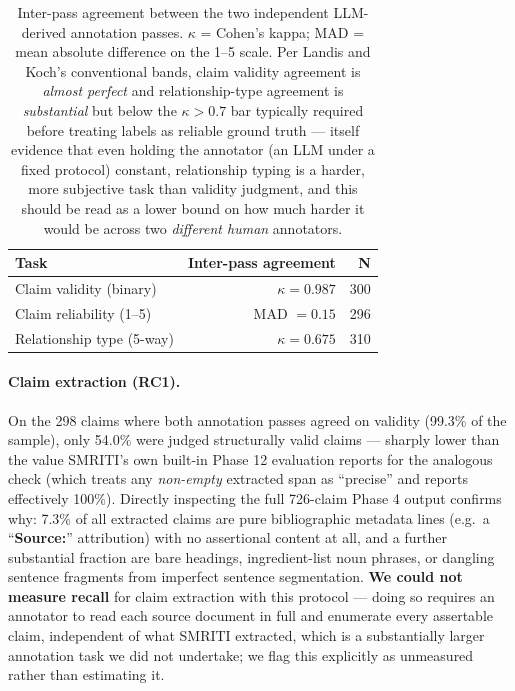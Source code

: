 \begin{table}[t]
\centering
\small
\begin{tabular}{lrr}
\toprule
\textbf{Task} & \textbf{Inter-pass agreement} & \textbf{N} \\
\midrule
Claim validity (binary) & $\kappa=0.987$ & 300 \\
Claim reliability (1--5) & MAD $=0.15$ & 296 \\
Relationship type (5-way) & $\kappa=0.675$ & 310 \\
\bottomrule
\end{tabular}
\caption{Inter-pass agreement between the two independent LLM-derived
annotation passes. $\kappa$ = Cohen's kappa; MAD = mean absolute difference
on the 1--5 scale. Per Landis and Koch's conventional bands, claim validity
agreement is \emph{almost perfect} and relationship-type agreement is
\emph{substantial} but below the $\kappa > 0.7$ bar typically required
before treating labels as reliable ground truth --- itself evidence that even
holding the annotator (an LLM under a fixed protocol) constant, relationship
typing is a harder, more subjective task than validity judgment, and this
should be read as a lower bound on how much harder it would be across two
\emph{different human} annotators.}
\label{tab:agreement}
\end{table}

\paragraph{Claim extraction (RC1).} On the 298 claims where both annotation
passes agreed on validity (99.3\% of the sample), only 54.0\% were judged
structurally valid claims --- sharply lower than the value SMRITI's own
built-in Phase 12 evaluation reports for the analogous check (which treats
any \emph{non-empty} extracted span as ``precise'' and reports effectively
100\%). Directly inspecting the full 726-claim Phase 4 output confirms why:
7.3\% of all extracted claims are pure bibliographic metadata lines (e.g.\ a
``\textbf{Source:}'' attribution) with no assertional content at all, and a
further substantial fraction are bare headings, ingredient-list noun
phrases, or dangling sentence fragments from imperfect sentence
segmentation. \textbf{We could not measure recall} for claim extraction
with this protocol --- doing so requires an annotator to read each source
document in full and enumerate every assertable claim, independent of
what SMRITI extracted, which is a substantially larger annotation task we
did not undertake; we flag this explicitly as unmeasured rather than
estimating it.

